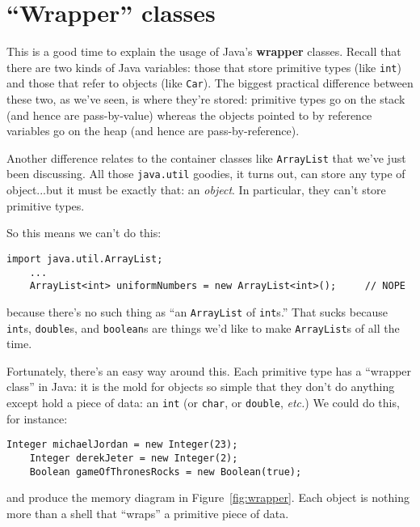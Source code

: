 \section{``Wrapper'' classes}

This is a good time to explain the usage of Java's \textbf{wrapper} classes.
Recall that there are two kinds of Java variables: those that store primitive
types (like \texttt{int}) and those that refer to objects (like \texttt{Car}).
The biggest practical difference between these two, as we've seen, is where
they're stored: primitive types go on the stack (and hence are pass-by-value)
whereas the objects pointed to by reference variables go on the heap (and
hence are pass-by-reference).

Another difference relates to the container classes like \texttt{ArrayList}
that we've just been discussing. All those \texttt{java.util} goodies, it
turns out, can store any type of object...but it must be exactly that: an
\textit{object}. In particular, they can't store primitive types.

So this means we can't do this:

\begin{Verbatim}[fontsize=\small,samepage=true]
    import java.util.ArrayList;
    ...
    ArrayList<int> uniformNumbers = new ArrayList<int>();     // NOPE
\end{Verbatim}

because there's no such thing as ``an \texttt{ArrayList} of \texttt{int}s.''
That sucks because \texttt{int}s, \texttt{double}s, and \texttt{boolean}s are
things we'd like to make \texttt{ArrayList}s of all the time.

Fortunately, there's an easy way around this. Each primitive type has a
``wrapper class'' in Java: it is the mold for objects so simple that they don't
do anything except hold a piece of data: an \texttt{int} (or \texttt{char}, or
\texttt{double}, \textit{etc.}) We could do this, for instance:

\begin{Verbatim}[fontsize=\small,samepage=true]
    Integer michaelJordan = new Integer(23);
    Integer derekJeter = new Integer(2);
    Boolean gameOfThronesRocks = new Boolean(true);
\end{Verbatim}

and produce the memory diagram in Figure~\ref{fig:wrapper}. Each object is
nothing more than a shell that ``wraps'' a primitive piece of data.

